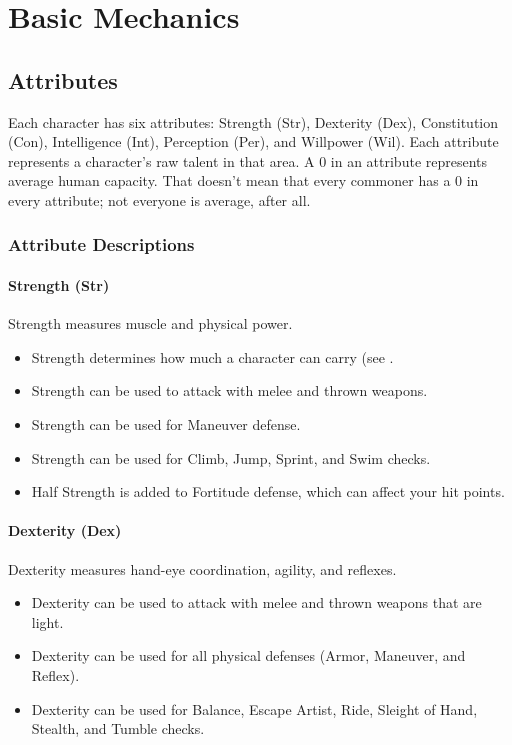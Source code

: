 \chapter{Basic Mechanics}

\section{Attributes}
Each character has six attributes: Strength (Str), Dexterity (Dex), Constitution (Con), Intelligence (Int), Perception (Per), and Willpower (Wil). Each attribute represents a character's raw talent in that area. A 0 in an attribute represents average human capacity. That doesn't mean that every commoner has a 0 in every attribute; not everyone is average, after all.

\subsection{Attribute Descriptions}

\subsubsection{Strength (Str)}
Strength measures muscle and physical power.
\begin{itemize}
    \item Strength determines how much a character can carry (see .
    \item Strength can be used to attack with melee and thrown weapons.
    \item Strength can be used for Maneuver defense.
    \item Strength can be used for Climb, Jump, Sprint, and Swim checks.
    \item Half Strength is added to Fortitude defense, which can affect your hit points.
\end{itemize}

\subsubsection{Dexterity (Dex)}
Dexterity measures hand-eye coordination, agility, and reflexes.
\begin{itemize}
    \item Dexterity can be used to attack with melee and thrown weapons that are light.
    \item Dexterity can be used for all physical defenses (Armor, Maneuver, and Reflex).
    \item Dexterity can be used for Balance, Escape Artist, Ride, Sleight of Hand, Stealth, and Tumble checks.
\end{itemize}

